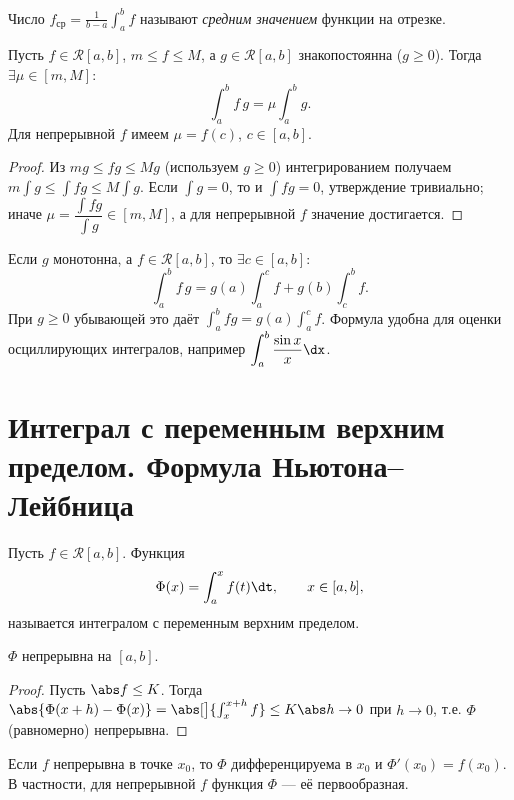Число $\displaystyle f_{\text{ср}}=\frac{1}{b-a}\int_a^b f$ называют \emph{средним значением}
функции на отрезке.

\begin{theorem}
Пусть $f\in\mathcal R[a,b]$, $m\le f\le M$, а $g\in\mathcal R[a,b]$ знакопостоянна ($g\ge0$).
Тогда $\exists\mu\in[m,M]$:
\[
  \int_a^b f\,g=\mu\!\int_a^b g .
\]
Для непрерывной $f$ имеем $\mu=f(c)$, $c\in[a,b]$.
\end{theorem}

\begin{proof}
Из $mg\le fg\le Mg$ (используем $g\ge0$) интегрированием получаем
$m\int g\le\int fg\le M\int g$. Если $\int g=0$, то и $\int fg=0$, утверждение тривиально; иначе
$\mu=\dfrac{\int fg}{\int g}\in[m,M]$, а для непрерывной $f$ значение достигается.
\end{proof}

\begin{remark}
Если $g$ монотонна, а $f\in\mathcal R[a,b]$, то $\exists c\in[a,b]$:
\[
  \int_a^b f\,g=g(a)\!\int_a^c f+g(b)\!\int_c^b f .
\]
При $g\ge0$ убывающей это даёт $\int_a^b fg=g(a)\int_a^c f$. Формула удобна для оценки
осциллирующих интегралов, например $\displaystyle\int_a^b\frac{\sin x}{x}\dx$.
\end{remark}

\section{Интеграл с переменным верхним пределом. Формула Ньютона–Лейбница}

Пусть $f\in\mathcal R[a,b]$. Функция
\[
  \Phi(x)=\int_a^x f(t)\dt,\qquad x\in[a,b],
\]
называется интегралом с переменным верхним пределом.

\begin{theorem}
$\Phi$ непрерывна на $[a,b]$.
\end{theorem}

\begin{proof}
Пусть $\abs f\le K$. Тогда
$\abs{\Phi(x+h)-\Phi(x)}=\abs[\big]{\int_x^{x+h}f}\le K\abs h\to0$ при $h\to0$, т.е. $\Phi$
(равномерно) непрерывна.
\end{proof}

\begin{theorem}[Барроу]
Если $f$ непрерывна в точке $x_0$, то $\Phi$ дифференцируема в $x_0$ и $\Phi'(x_0)=f(x_0)$.
В частности, для непрерывной $f$ функция $\Phi$ — её первообразная.
\end{theorem}

